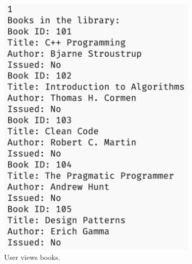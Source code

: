 \documentclass[12pt,a4paper]{report}
\begin{document}
\begin{figure}[h!]
    \centering
    \includegraphics[width=0.85\textwidth, height=0.65\textheight, keepaspectratio]{"./src/Screenshot_2024-11-24_at_16.15.02.png"}
    \caption{User views books.}
    \label{fig:second}
\end{figure}
\end{document}
